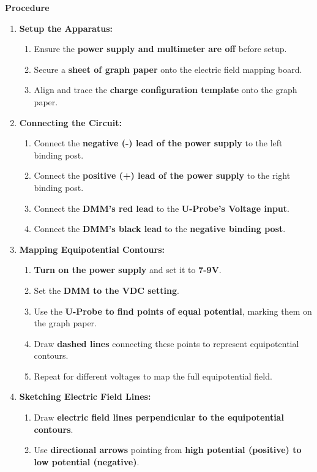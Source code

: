 \documentclass[idxtotoc,hyperref,openany]{labbook} %
\begin{document}
\hfill \break
\textbf{Procedure}
\begin{enumerate}
    \item \textbf{Setup the Apparatus:}
    \begin{enumerate}[$\bullet$]
        \item Ensure the \textbf{power supply and multimeter are off} before setup.
        \item Secure a \textbf{sheet of graph paper} onto the electric field mapping board.
        \item Align and trace the \textbf{charge configuration template} onto the graph paper.
    \end{enumerate}
    \item \textbf{Connecting the Circuit:}
    \begin{enumerate}[$\bullet$]
        \item Connect the \textbf{negative (-) lead of the power supply} to the left binding post.
        \item Connect the \textbf{positive (+) lead of the power supply} to the right binding post.
        \item Connect the \textbf{DMM’s red lead} to the \textbf{U-Probe’s Voltage input}.
        \item Connect the \textbf{DMM’s black lead} to the \textbf{negative binding post}.
    \end{enumerate}
    \item \textbf{Mapping Equipotential Contours:}
    \begin{enumerate}[$\bullet$]
        \item \textbf{Turn on the power supply} and set it to \textbf{7-9V}.
        \item Set the \textbf{DMM to the VDC setting}.
        \item Use the \textbf{U-Probe to find points of equal potential}, marking them on the graph paper.
        \item Draw \textbf{dashed lines} connecting these points to represent equipotential contours.
        \item Repeat for different voltages to map the full equipotential field.
    \end{enumerate}
    \item \textbf{Sketching Electric Field Lines:}
    \begin{enumerate}[$\bullet$]
        \item Draw \textbf{electric field lines perpendicular to the equipotential contours}.
        \item Use \textbf{directional arrows} pointing from \textbf{high potential (positive) to low potential (negative)}.

\end{enumerate}
\end{enumerate}
\end{document}
